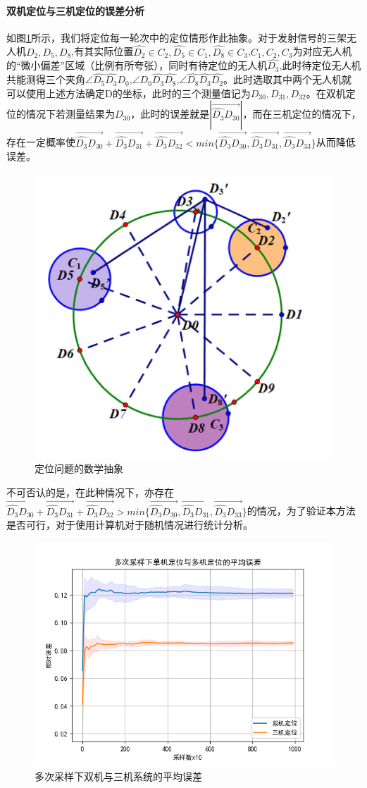 \documentclass[withoutpreface,bwprint]{cumcmthesis} %
\begin{document}
		\paragraph{双机定位与三机定位的误差分析}
		如图\ref{fig16}所示，我们将定位每一轮次中的定位情形作此抽象。对于发射信号的三架无人机$D_2,D_5,D_8$,有其实际位置$\widehat{D_2}\in C_2,\widehat{D_5} \in C_1,\widehat{D_8}\in C_3$,$C_1,C_2,C_3$为对应无人机的“微小偏差”区域（比例有所夸张），同时有待定位的无人机$\widehat{D_3}$,此时待定位无人机共能测得三个夹角$\angle \widehat{D_5}\widehat{D_3}D_0$,$\angle D_0\widehat{D_3}\widehat{D_8}$,$\angle \widehat{D_8}\widehat{D_3}\widehat{D_2}$。此时选取其中两个无人机就可以使用上述方法确定D的坐标，此时的三个测量值记为$D_{30},D_{31},D_{32}$。在双机定位的情况下若测量结果为$D_{30}$，此时的误差就是$|\overrightarrow{\widehat{D_3}D_{30}}|$，而在三机定位的情况下，存在一定概率使$\overrightarrow{\widehat{D_3}D_{30}}+\overrightarrow{\widehat{D_3}D_{31}}+\overrightarrow{\widehat{D_3}D_{32}} < min\{\overrightarrow{\widehat{D_3}D_{30}},\overrightarrow{\widehat{D_3}D_{31}},\overrightarrow{\widehat{D_3}D_{33}}\}$从而降低误差。
		\begin{figure}[H]
			\centering
			\includegraphics[width=0.5\linewidth]{./figures/16}
			\caption{定位问题的数学抽象}
			\label{fig16}
		\end{figure}
		不可否认的是，在此种情况下，亦存在$\overrightarrow{\widehat{D_3}D_{30}}+\overrightarrow{\widehat{D_3}D_{31}}+\overrightarrow{\widehat{D_3}D_{32}} > min\{\overrightarrow{\widehat{D_3}D_{30}},\overrightarrow{\widehat{D_3}D_{31}},\overrightarrow{\widehat{D_3}D_{33}}\}$的情况，为了验证本方法是否可行，对于使用计算机对于随机情况进行统计分析。
		\begin{figure}[H]
			\centering
			\includegraphics[width=0.75\linewidth]{./figures/15}
			\caption{多次采样下双机与三机系统的平均误差}
			\label{fig15}
		\end{figure}
\end{document}
